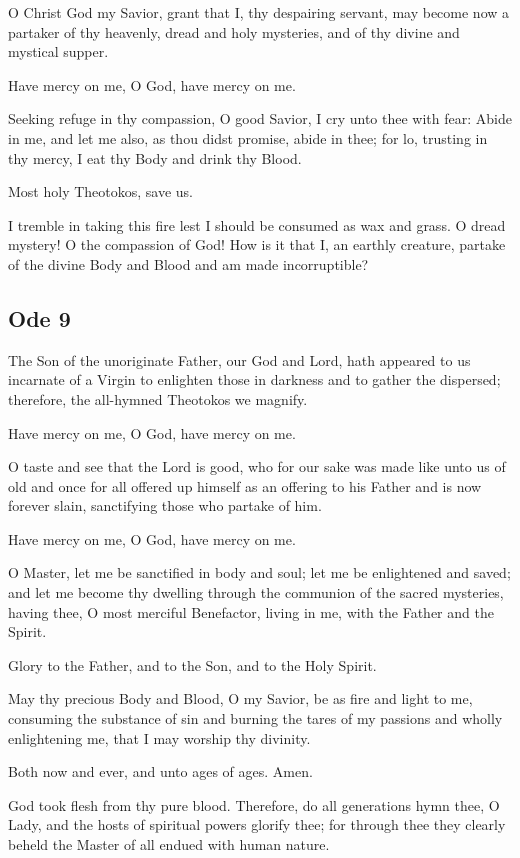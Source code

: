 O Christ God my Savior, grant that I, thy despairing servant, may become now a partaker of thy heavenly, dread and holy mysteries, and of thy divine and mystical supper.

\hspace{1em} Have mercy on me, O God, have mercy on me.

Seeking refuge in thy compassion, O good Savior, I cry unto thee with fear: Abide in me, and let me also, as thou didst promise, abide in thee; for lo, trusting in thy mercy, I eat thy Body and drink thy Blood.

\hspace{1em} Most holy Theotokos, save us.

I tremble in taking this fire lest I should be consumed as wax and grass. O dread mystery! O the compassion of God! How is it that I, an earthly creature, partake of the divine Body and Blood and am made incorruptible?

\subsection{Ode 9}

 The Son of the unoriginate Father, our God and Lord, hath appeared to us incarnate of a Virgin to enlighten those in darkness and to gather the dispersed; therefore, the all-hymned Theotokos we magnify.

\hspace{1em} Have mercy on me, O God, have mercy on me.

O taste and see that the Lord is good, who for our sake was made like unto us of old and once for all offered up himself as an offering to his Father and is now forever slain, sanctifying those who partake of him.

\hspace{1em} Have mercy on me, O God, have mercy on me.

O Master, let me be sanctified in body and soul; let me be enlightened and saved; and let me become thy dwelling through the communion of the sacred mysteries, having thee, O most merciful Benefactor, living in me, with the Father and the Spirit.

\hspace{1em} Glory to the Father, and to the Son, and to the Holy Spirit.

May thy precious Body and Blood, O my Savior, be as fire and light to me, consuming the substance of sin and burning the tares of my passions and wholly enlightening me, that I may worship thy divinity.

\hspace{1em} Both now and ever, and unto ages of ages. Amen.

God took flesh from thy pure blood. Therefore, do all generations hymn thee, O Lady, and the hosts of spiritual powers glorify thee; for through thee they clearly beheld the Master of all endued with human nature.

\cleardoublepage

